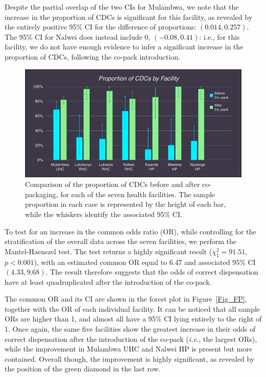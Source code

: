 \documentclass[a4paper, 12pt]{article}
\begin{document}
Despite the partial overlap of the two CIs for Mulambwa, we note that the increase in the proportion of CDCs is significant for this facility, as revealed by the entirely positive 95\% CI for the difference of proportions: $(0.014, 0.257)$. The 95\% CI for Nalwei does instead include 0, $(-0.08, 0.41)$: i.e., for this facility, we do not have enough evidence to infer a significant increase in the proportion of CDCs, following the co-pack introduction. 

\begin{figure}
\includegraphics[width=\textwidth]{HC_Proportions}
\caption{Comparison of the proportion of CDCs before and after co-packaging, for each of the seven health facilities. The sample proportion in each case is represented by the height of each bar, while the whiskers identify the associated 95\% CI.}
\label{Fig_Single_Proportions}
\end{figure}

To test for an increase in the common odds ratio (OR), while controlling for the stratification of the overall data across the seven facilities, we perform the Mantel-Haenszel test. The test returns a highly significant result ($\chi_1^2=91.51$, $p<0.001$), with an estimated common OR equal to $6.47$ and associated 95\% CI $(4.33, 9.68)$. The result therefore suggests that the odds of correct dispensation have at least quadruplicated after the introduction of the co-pack.

The common OR and its CI are shown in the forest plot in Figure~\ref{Fig_FP}, together with the OR of each individual facility. It can be noticed that all sample ORs are higher than 1, and almost all have a 95\% CI lying entirely to the right of 1. Once again, the same five facilities show the greatest increase in their odds of correct dispensation after the introduction of the co-pack (\textit{i.e.}, the largest ORs), while the improvement in Mulambwa UHC and Nalwei HP is present but more contained. Overall though, the improvement is highly significant, as revealed by the position of the green diamond in the last row.
\end{document}
